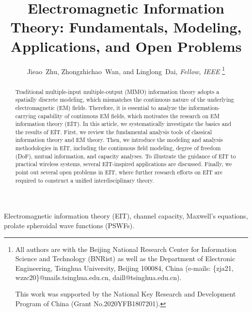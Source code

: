 \documentclass[journal,twocolumn]{IEEEtran}
\begin{document}
\title{Electromagnetic Information Theory: Fundamentals, Modeling, Applications, and Open Problems}

\author{{Jieao~Zhu, Zhongzhichao~Wan, and Linglong~Dai, {\textit{Fellow, IEEE}}}
\thanks{All authors are with the Beijing National Research Center for Information Science and Technology (BNRist) as well as the Department of Electronic Engineering, Tsinghua University, Beijing 100084, China (e-mails: \{zja21, wzzc20\}@mails.tsinghua.edu.cn, daill@tsinghua.edu.cn).

This work was supported by the National Key Research and Development Program of China (Grant No.2020YFB1807201). }
}

\maketitle

\begin{abstract}
	Traditional multiple-input multiple-output (MIMO) information theory adopts a spatially discrete modeling, which mismatches the continuous nature of the underlying electromagnetic (EM) fields. %
 	Therefore, it is essential to analyze the information-carrying capability of continuous EM fields, which motivates the research on EM information theory (EIT). In this article, we systematically investigate the basics and the results of EIT. First, we review the fundamental analysis tools of classical information theory and EM theory. Then, we introduce the modeling and analysis methodologies in EIT, including the continuous field modeling, degree of freedom (DoF), mutual information, and capacity analyses. To illustrate the guidance of EIT to practical wireless systems, several EIT-inspired applications are discussed. Finally, we point out several open problems in EIT, where further research efforts on EIT are required to construct a unified interdisciplinary theory.
\end{abstract}

\begin{IEEEkeywords}
    Electromagnetic information theory (EIT), channel capacity, Maxwell's equations, prolate spheroidal wave functions (PSWFs). 
\end{IEEEkeywords}
\end{document}
